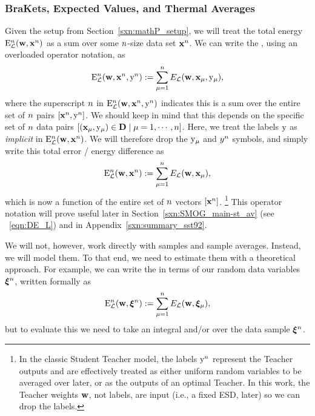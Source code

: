 \subsubsection{BraKets, Expected Values, and Thermal Averages}
\label{sxn:mathP_averages}
Given the setup from Section~\ref{sxn:mathP_setup},
we will treat the total energy ${\mathrm{E}}^{n}_{\mathcal{L}}(\mathbf{w}, \mathbf{x}^{n})$ as a sum over some $n$-size data set $\mathbf{x}^{n}$.
We can write the \TotalDataSampleError, using an overloaded operator notation, as
\begin{align}
  \label{eqn:detopxy}
  \mathrm{{E}}^{n}_{\mathcal{L}}(\mathbf{w}, \mathbf{x}^{n}, \mathrm{y}^{n}) :=\sum_{\mu=1}^{n}{E}_{\mathcal{L}}({\mathbf{w}},{\mathbf{x}}_{\mu}, \mathrm{y}_{\mu})  ,
\end{align}
where the superscript $n$ in $\mathrm{{E}}^{n}_{\mathcal{L}}(\mathbf{w}, \mathbf{x}^{n}, \mathrm{y}^{n})$ indicates this is a sum over the entire set of $n$ pairs $[\mathbf{x}^{n}, \mathrm{y}^{n}]$.
 We should keep in mind that this depends on the specific set of $n$ data pairs $[({\mathbf{x}}_{\mu},\mathrm{y}_{\mu})\in\mathbf{D}\;|\;\mu=1,\cdots,n]$.
Here, we treat %
the labels $\mathrm{y}$ as
\emph{implicit} in ${\mathrm{E}}^{n}_{\mathcal{L}}(\mathbf{w}, \mathbf{x}^{n})$.
We will therefore drop the $\mathrm{y}_{\mu}$ and $y^{n}$ symbols, 
and simply write this total error / energy difference as
\begin{align}
  \label{eqn:detox_FIXLATER}
  {\mathrm{E}}^{n}_{\mathcal{L}}(\mathbf{w}, \mathbf{x}^{n}) :=\sum_{\mu=1}^{n}{E}_{\mathcal{L}}({\mathbf{w}},{\mathbf{x}}_{\mu})  ,
\end{align}
which is now a function of the entire set of $n$ vectors $[\mathbf{x}^{n}]$.%
\footnote{In the classic Student Teacher model, the labels  $\mathrm{y}^{n}$ represent the Teacher outputs and are effectively treated as either uniform random variables to be averaged over later, or as the outputs of an optimal Teacher. In this work, the Teacher weights ${\mathbf{w}}$, not labels, are input (i.e., a fixed ESD, later) so we can drop the labels.}
This operator notation will prove useful later in Section~\ref{sxn:SMOG_main-st_av}
(see \EQN~\ref{eqn:DE_L}) and in Appendix~\ref{sxn:summary_sst92}.

We will not, however, work directly with samples and sample averages.
Instead, we will model them.
To that end, we need to estimate them with a theoretical approach. For example, we can write the \TotalDataSampleError 
in terms of our random data variables $\boldsymbol{\xi}^{n}$, written formally as
\begin{align}
\label{eqn:tdse}
\mathbf{\mathrm{E}}^{n}_{\mathcal{L}}(\mathbf{w}, \boldsymbol{\xi}^{n}) := \sum_{\mu=1}^{n}{E}_{\mathcal{L}}(\mathbf{w},\boldsymbol{\xi}_{\mu}) ,
\end{align}
but to evaluate this we need to take an integral and/or \ExpectedValue over the data sample $\boldsymbol{\xi}^{n}$.


